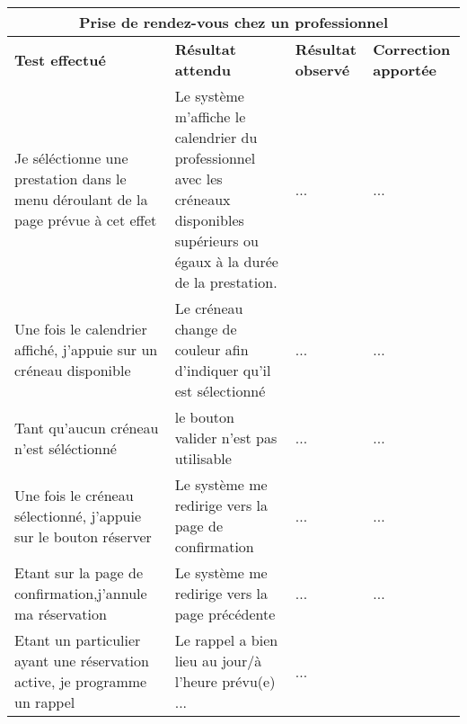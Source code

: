 \documentclass{article}
\begin{document}
  \begin{center}
    \begin{tabular}{|p{4cm}|p{4cm}|p{4cm}|p{4cm}|}
      \hline

      \multicolumn{4}{|c|}{\textbf{Prise de rendez-vous chez un professionnel}} \\
      \hline
      \textbf{Test effectué} & \textbf{Résultat attendu} & \textbf{Résultat observé}  & \textbf{Correction apportée}\\
      \hline

      Je séléctionne une prestation dans le menu déroulant de la page prévue à cet effet&
      Le système m'affiche le calendrier du professionnel avec les créneaux disponibles supérieurs ou égaux à la durée de la prestation.&
      ...&
      ... \\

      \hline
      \hline

      Une fois le calendrier affiché, j'appuie sur un créneau disponible&
      Le créneau change de couleur afin d'indiquer qu'il est sélectionné&
      ...&
      ... \\
	\hline
      \hline


      Tant qu'aucun créneau n'est séléctionné&
      le bouton valider n'est pas utilisable&
      ...&
      ... \\
      
       \hline
      \hline
      Une fois le créneau sélectionné, j'appuie sur le bouton réserver&
      Le système me redirige vers la page de confirmation&
      ...&
      ... \\
     
      \hline
      \hline
      Etant sur la page de confirmation,j'annule ma réservation&
      Le système me redirige vers la page précédente&
      ...&
      ... \\

		\hline
      \hline
      Etant un particulier ayant une réservation active, je programme un rappel&
      Le rappel a bien lieu au jour/à l'heure prévu(e)
      ...&
      ... \\

      \hline

    \end{tabular}
  \end{center}
\end{document}
